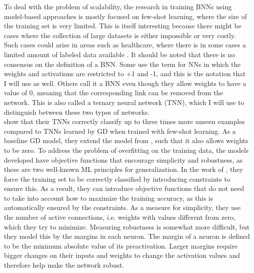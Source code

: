 \noindent To deal with the problem of scalability, the research in training BNNs using model-based approaches is mostly focused on few-shot learning, where the size of the training set is very limited. This is itself interesting because there might be cases where the collection of large datasets is either impossible or very costly. Such cases could arise in areas such as healthcare, where there is in some cases a limited amount of labeled data available \citep{ching2017}. It should be noted that there is no consensus on the definition of a BNN. Some use the term for NNs in which the weights and activations are restricted to +1 and -1, and this is the notation that I will use as well. Others call it a BNN even though they allow weights to have a value of 0, meaning that the corresponding link can be removed from the network. This is also called a ternary neural network (TNN), which I will use to distinguish between these two types of networks. \\

\noindent \cite{icarte2019} show that their TNNs correctly classify up to three times more unseen examples compared to TNNs learned by GD when trained with few-shot learning. As a baseline GD model, they extend the model from \cite{Hubara2016}, such that it also allows weights to be zero. To address the problem of overfitting on the training data, the models developed have objective functions that encourage simplicity and robustness, as these are two well-known ML principles for generalization. In the work of \cite{icarte2019}, they force the training set to be correctly classified by introducing constraints to ensure this. As a result, they can introduce objective functions that do not need to take into account how to maximize the training accuracy, as this is automatically ensured by the constraints. As a measure for simplicity, they use the number of active connections, i.e. weights with values different from zero, which they try to minimize. Measuring robustness is somewhat more difficult, but they model this by the margins in each neuron. The margin of a neuron is defined to be the minimum absolute value of its preactivation. Larger margins require bigger changes on their inputs and weights to change the activation values and therefore help make the network robust. \\

